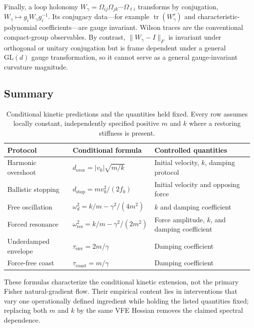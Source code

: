 \documentclass[12pt]{article}
\begin{document}
Finally, a loop holonomy $W_\gamma=\Omega_{ij}\Omega_{jk}\cdots\Omega_{\ell i}$ transforms by conjugation, $W_\gamma\mapsto g_iW_\gamma g_i^{-1}$.  Its conjugacy data---for example $\operatorname{tr}(W_\gamma^r)$ and characteristic-polynomial coefficients---are gauge invariant.  Wilson traces are the conventional compact-group observables.  By contrast, $\|W_\gamma-I\|_F$ is invariant under orthogonal or unitary conjugation but is frame dependent under a general $\mathrm{GL}(d)$ gauge transformation, so it cannot serve as a general gauge-invariant curvature magnitude.

\subsection{Summary}

\begin{table}[ht]
\centering
\caption{Conditional kinetic predictions and the quantities held fixed.  Every row assumes locally constant, independently specified positive $m$ and $k$ where a restoring stiffness is present.}
\label{tab:predictions}
\renewcommand{\arraystretch}{1.3}
\begin{tabular}{@{} p{3cm} p{5cm} p{5cm} @{}}
\toprule
\textbf{Protocol} & \textbf{Conditional formula} & \textbf{Controlled quantities} \\
\midrule
Harmonic overshoot & $d_{\mathrm{over}}=|v_0|\sqrt{m/k}$ & Initial velocity, $k$, damping protocol \\[6pt]
Ballistic stopping & $d_{\mathrm{stop}}=mv_0^2/(2f_0)$ & Initial velocity and opposing force \\[6pt]
Free oscillation & $\omega_d^2=k/m-\gamma^2/(4m^2)$ & $k$ and damping coefficient \\[6pt]
Forced resonance & $\omega_{\mathrm{res}}^2=k/m-\gamma^2/(2m^2)$ & Force amplitude, $k$, and damping coefficient \\[6pt]
Underdamped envelope & $\tau_{\mathrm{env}}=2m/\gamma$ & Damping coefficient \\[6pt]
Force-free coast & $\tau_{\mathrm{coast}}=m/\gamma$ & Damping coefficient \\
\bottomrule
\end{tabular}
\end{table}

These formulas characterize the conditional kinetic extension, not the primary Fisher natural-gradient flow.  Their empirical content lies in interventions that vary one operationally defined ingredient while holding the listed quantities fixed; replacing both $m$ and $k$ by the same VFE Hessian removes the claimed spectral dependence.
\end{document}
